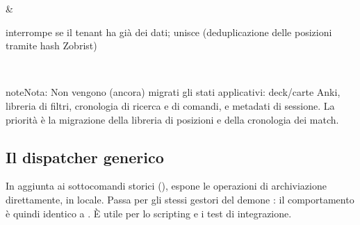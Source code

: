 \documentclass[letterpaper,10pt,italian]{sphinxmanual}
\begin{document}
\begin{savenotes}
\begin{tabular}[t]{}
\begin{varwidth}[t]{}
\sphinxbeforeendvarwidth
\end{varwidth}%
&\begin{varwidth}[t]{}
\sphinxAtStartPar
{} interrompe se il tenant ha già dei dati;  unisce (deduplicazione delle posizioni tramite hash Zobrist)
\sphinxbeforeendvarwidth
\end{varwidth}%
\\
\sphinxbottomrule
\end{tabular}
\sphinxtableafterendhook\par
\sphinxattableend\end{savenotes}

\begin{sphinxadmonition}{note}{Nota:}
\sphinxAtStartPar
Non vengono (ancora) migrati gli stati applicativi: deck/carte Anki, libreria di filtri, cronologia di ricerca e di comandi, e metadati di sessione. La priorità è la migrazione della libreria di posizioni e della cronologia dei match.
\end{sphinxadmonition}


\subsection{Il dispatcher generico }
\label{\detokenize{mode_headless:le-dispatcher-generique-call}}\label{\detokenize{mode_headless:headless-call}}
\sphinxAtStartPar
In aggiunta ai sottocomandi storici ({\hyperref[\detokenize{cli:cli}]{}}),  espone  le operazioni di archiviazione direttamente, in locale. Passa per gli stessi gestori del demone : il comportamento è quindi identico a . È utile per lo scripting e i test di integrazione.
\end{document}
